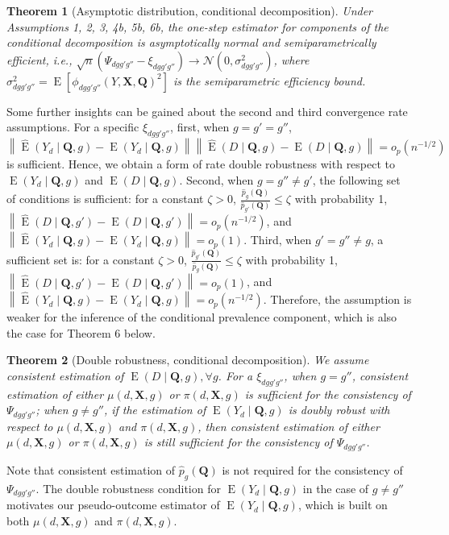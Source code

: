 \documentclass[12pt,a4paper]{article}
\newtheorem{prop}{Theorem}
\newcommand{\E}{\operatorname{E}}
\def\X{{\boldsymbol X}}
\def\Q{{\boldsymbol Q}}
\begin{document}
\begin{prop}[Asymptotic distribution, conditional decomposition]
Under Assumptions 1, 2, 3, 4b, 5b, 6b, the one-step estimator for components of the conditional decomposition is asymptotically normal and semiparametrically efficient, i.e., $\sqrt{n} \left( \Psi_{dgg'g''} - \xi_{dgg'g''} \right) \xrightarrow{} \mathcal{N}(0, \sigma^2_{dgg'g''})$, where $\sigma^2_{dgg'g''}=\E \left[\phi_{dgg'g''}(Y,\X,\Q)^2 \right]$ is the semiparametric efficiency bound.
\end{prop}
Some further insights can be gained about the second and third convergence rate assumptions. For a specific $\xi_{dgg'g''}$, first, when $g=g'=g''$, $\left\| \hat{\E}\left( Y_d \mid \Q, g \right) - \E(Y_d \mid \Q,g)  \right\| \left\| \hat{\E}(D \mid \Q, g) - \E(D \mid \Q, g)  \right\| = o_p(n^{-1/2})$ is sufficient. Hence, we obtain a form of rate double robustness with respect to $\E(Y_d \mid \Q,g)$ and $\E(D \mid \Q, g)$. Second, when $g= g'' \neq g'$, the following set of conditions is sufficient: for a constant $\zeta>0$, $\frac{\hat{p}_g(\Q)}{\hat{p}_{g'}(\Q)} \leq \zeta$ with probability 1, $\left\| \hat{\E}(D \mid \Q, g') - \E(D \mid \Q, g') \right\|=o_p(n^{-1/2})$, and $ \left\| \hat{\E}\left( Y_d \mid \Q, g \right) - \E(Y_d \mid \Q,g) \right\|=o_p(1)$. Third, when $g'=g'' \neq g$, a sufficient set is: for a constant $\zeta>0$, $ \frac{\hat{p}_{g'}(\Q)}{\hat{p}_{g}(\Q)} \leq \zeta$ with probability 1, $\left\| \hat{\E}(D \mid \Q, g') - \E(D \mid \Q, g') \right\|=o_p(1)$, and $\left\| \hat{\E}\left( Y_d \mid \Q, g \right) - \E(Y_d \mid \Q,g)  \right\|=o_p(n^{-1/2})$. Therefore, the assumption is weaker for the inference of the conditional prevalence component, which is also the case for Theorem 6 below.

\begin{prop}[Double robustness, conditional decomposition]
We assume consistent estimation of $\E(D \mid \Q, g), \forall g$. For a $\xi_{dgg'g''}$, when $g=g''$, consistent estimation of either $\mu(d,\X,g)$ or $\pi(d,\X,g)$ is sufficient for the consistency of $\Psi_{dgg'g''}$; when $g \neq g''$, if the estimation of $\E(Y_d \mid \Q,g)$ is doubly robust with respect to $\mu(d,\X,g)$ and $\pi(d,\X,g)$, then consistent estimation of either $\mu(d,\X,g)$ or $\pi(d,\X,g)$ is still sufficient for the consistency of $\Psi_{dgg'g''}$.
\end{prop}
Note that consistent estimation of $\hat{p}_g(\Q)$ is not required for the consistency of $\Psi_{dgg'g''}$. The double robustness condition for $\E(Y_d \mid \Q,g)$ in the case of $g \neq g''$ motivates our pseudo-outcome estimator of $\E(Y_d \mid \Q,g)$, which is built on both $\mu(d,\X,g)$ and $\pi(d,\X,g)$.
\end{document}
